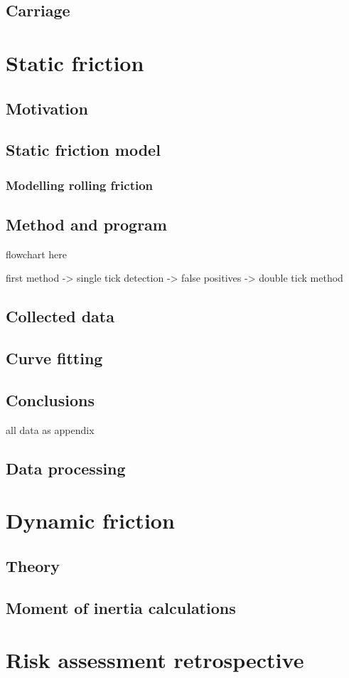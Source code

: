 \documentclass[12pt]{article}
\begin{document}
\subsection{Carriage}

\section{Static friction}
\subsection{Motivation}

\subsection{Static friction model}
\subsubsection{Modelling rolling friction}
\subsection{Method and program}

flowchart here

first method -> single tick detection -> false positives -> double tick method


\subsection{Collected data}
\subsection{Curve fitting}
\subsection{Conclusions}





all data as appendix 

\subsection{Data processing}

\section{Dynamic friction}



\subsection{Theory}

\subsection{Moment of inertia calculations}






\section{Risk assessment retrospective}
\end{document}
